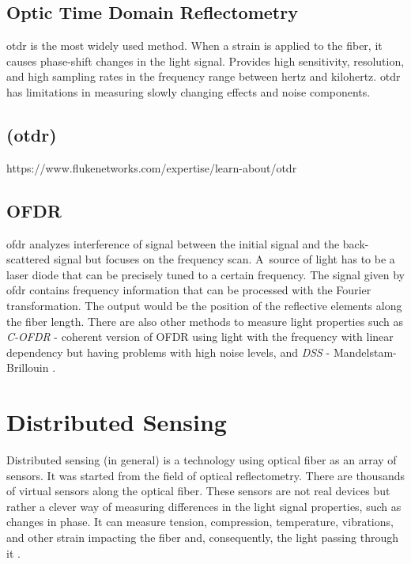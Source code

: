\subsection{Optic Time Domain Reflectometry}\label{txt.reflectometry.otdr}

\ac{otdr} is the most widely used method. When a strain is applied to the fiber, it causes phase-shift changes in the light signal. Provides high sensitivity, resolution, and high sampling rates in the frequency range between hertz and kilohertz. \ac{otdr} has limitations in measuring slowly changing effects and noise components.

\subsection{(\acs{otdr})}   %

https://www.flukenetworks.com/expertise/learn-about/otdr


\subsection{OFDR}\label{txt.reflectometry.ofdr}

\ac{ofdr} analyzes interference of signal between the initial signal and the back-scattered signal but focuses on the frequency scan. A~source of light has to be a laser diode that can be precisely tuned to a certain frequency. The signal given by \ac{ofdr} contains frequency information that can be processed with the Fourier transformation. The output would be the position of the reflective elements along the fiber length. There are also other methods to measure light properties such as \textit{C-OFDR} - coherent version of OFDR using light with the frequency with linear dependency but having problems with high noise levels, and \textit{DSS} - Mandelstam-Brillouin \cite{kislov_das_newparadigm}.

\section{Distributed Sensing}\label{txt.distributed}

Distributed sensing (in general) is a technology using optical fiber as an array of sensors. It was started from the field of optical reflectometry. There are thousands of virtual sensors along the optical fiber. These sensors are not real devices but rather a clever way of measuring differences in the light signal properties, such as changes in phase. It can measure tension, compression, temperature, vibrations, and other strain impacting the fiber and, consequently, the light passing through it \cite{dasKislov}.

